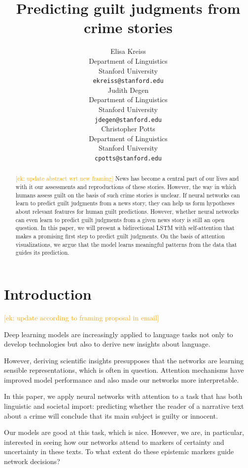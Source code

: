\documentclass[11pt,a4paper]{article}
\title{Predicting guilt judgments from crime stories}
\author{Elisa Kreiss \\
  Department of Linguistics \\
  Stanford University \\
  \texttt{ekreiss@stanford.edu} \\\And
  Judith Degen \\
  Department of Linguistics \\
  Stanford University \\
  \texttt{jdegen@stanford.edu} \\\And
  Christopher Potts \\
  Department of Linguistics \\
  Stanford University \\
  \texttt{cpotts@stanford.edu}\\}
\date{}
\newcommand{\ek}[1]{\textcolor{Orange}{[ek: #1]}}
\begin{document}
\maketitle
\begin{abstract}
  \ek{update abstract wrt new framing}
  News has become a central part of our lives and with it our assessments and reproductions of these stories. However, the way in which humans assess guilt on the basis of such crime stories is unclear. If neural networks can learn to predict guilt judgments from a news story, they can help us form hypotheses about relevant features for human guilt predictions. However, whether neural networks can even learn to predict guilt judgments from a given news story is still an open question. In this paper, we will present a bidirectional LSTM with self-attention that makes a promising first step to predict guilt judgments. On the basis of attention visualizations, we argue that the model learns meaningful patterns from the data that guides its prediction.
\end{abstract}

\section{Introduction}

\ek{update according to framing proposal in email}

Deep learning models are increasingly applied to language tasks not only to develop technologies but also to derive new insights about language.

However, deriving scientific insights presupposes that the networks are learning sensible representations, which is often in question. Attention mechanisms have improved model performance and also made our networks more interpretable.

In this paper, we apply neural networks with attention to a task that has both linguistic and societal import: predicting whether the reader of a narrative text about a crime will conclude that its main subject is guilty or innocent.

Our models are good at this task, which is nice. However, we are, in particular, interested in seeing how our networks attend to markers of certainty and uncertainty in these texts. To what extent do these epistemic markers guide network decisions?


\end{document}
